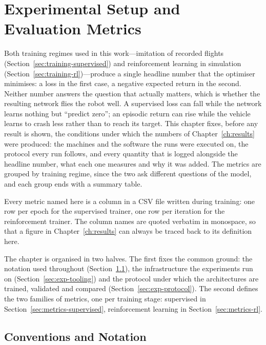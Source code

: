 \chapter{Experimental Setup and Evaluation Metrics}
\label{ch:experiments}

Both training regimes used in this work---imitation of recorded flights
(Section~\ref{sec:training-supervised}) and reinforcement learning in
simulation (Section~\ref{sec:training-rl})---produce a single headline number
that the optimiser minimises: a loss in the first case, a negative expected
return in the second. Neither number answers the question that actually
matters, which is whether the resulting network flies the robot well. A
supervised loss can fall while the network learns nothing but ``predict zero'';
an episodic return can rise while the vehicle learns to crash less rather than
to reach its target. This chapter fixes, before any result is shown, the
conditions under which the numbers of Chapter~\ref{ch:results} were produced:
the machines and the software the runs were executed on, the protocol every run
follows, and every quantity that is logged alongside the headline number, what
each one measures and why it was added. The metrics are grouped by training
regime, since the two ask different questions of the model, and each group ends
with a summary table.

Every metric named here is a column in a CSV file written during training: one
row per epoch for the supervised trainer, one row per iteration for the
reinforcement trainer. The column names are quoted verbatim in monospace, so
that a figure in Chapter~\ref{ch:results} can always be traced back to its
definition here.

The chapter is organised in two halves. The first fixes the common ground: the
notation used throughout (Section~\ref{sec:metrics-notation}), the
infrastructure the experiments run on (Section~\ref{sec:exp-tooling}) and the
protocol under which the architectures are trained, validated and compared
(Section~\ref{sec:exp-protocol}). The second defines the two families of
metrics, one per training stage: supervised in
Section~\ref{sec:metrics-supervised}, reinforcement learning in
Section~\ref{sec:metrics-rl}.

\section{Conventions and Notation}
\label{sec:metrics-notation}

